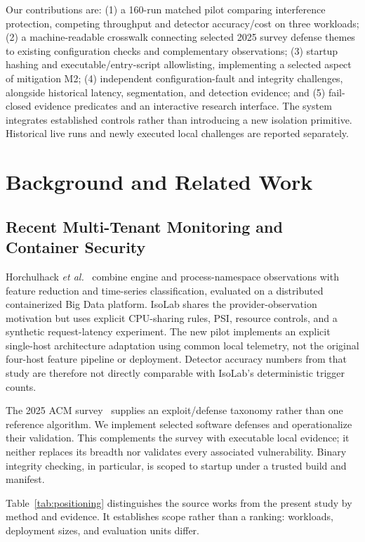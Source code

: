 \documentclass[conference,letterpaper]{IEEEtran}
\begin{document}
Our contributions are: (1) a 160-run matched pilot comparing interference protection, competing throughput and detector accuracy/cost on three workloads; (2) a machine-readable crosswalk connecting selected 2025 survey defense themes to existing configuration checks and complementary observations; (3) startup hashing and executable/entry-script allowlisting, implementing a selected aspect of mitigation M2; (4) independent configuration-fault and integrity challenges, alongside historical latency, segmentation, and detection evidence; and (5) fail-closed evidence predicates and an interactive research interface. The system integrates established controls rather than introducing a new isolation primitive. Historical live runs and newly executed local challenges are reported separately.

\section{Background and Related Work}
\subsection{Recent Multi-Tenant Monitoring and Container Security}
Horchulhack \emph{et al.}~\cite{qos2024} combine engine and process-namespace observations with feature reduction and time-series classification, evaluated on a distributed containerized Big Data platform. IsoLab shares the provider-observation motivation but uses explicit CPU-sharing rules, PSI, resource controls, and a synthetic request-latency experiment. The new pilot implements an explicit single-host architecture adaptation using common local telemetry, not the original four-host feature pipeline or deployment. Detector accuracy numbers from that study are therefore not directly comparable with IsoLab's deterministic trigger counts.

The 2025 ACM survey~\cite{acm2025} supplies an exploit/defense taxonomy rather than one reference algorithm. We implement selected software defenses and operationalize their validation. This complements the survey with executable local evidence; it neither replaces its breadth nor validates every associated vulnerability. Binary integrity checking, in particular, is scoped to startup under a trusted build and manifest.


Table~\ref{tab:positioning} distinguishes the source works from the present study by method and evidence. It establishes scope rather than a ranking: workloads, deployment sizes, and evaluation units differ.
\end{document}
